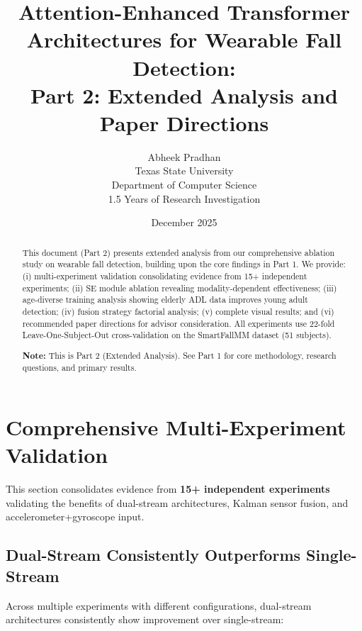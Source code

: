 \documentclass{article}
\title{Attention-Enhanced Transformer Architectures for Wearable Fall Detection:\\Part 2: Extended Analysis and Paper Directions}
\author{Abheek Pradhan\\Texas State University\\Department of Computer Science\\1.5 Years of Research Investigation}
\date{December 2025}
\begin{document}
\maketitle

\begin{abstract}
This document (Part 2) presents extended analysis from our comprehensive ablation study on wearable fall detection, building upon the core findings in Part 1. We provide: (i) multi-experiment validation consolidating evidence from 15+ independent experiments; (ii) SE module ablation revealing modality-dependent effectiveness; (iii) age-diverse training analysis showing elderly ADL data improves young adult detection; (iv) fusion strategy factorial analysis; (v) complete visual results; and (vi) recommended paper directions for advisor consideration. All experiments use 22-fold Leave-One-Subject-Out cross-validation on the SmartFallMM dataset (51 subjects).

\textbf{Note:} This is Part 2 (Extended Analysis). See Part 1 for core methodology, research questions, and primary results.
\end{abstract}

\tableofcontents
\newpage

\section{Comprehensive Multi-Experiment Validation}

This section consolidates evidence from \textbf{15+ independent experiments} validating the benefits of dual-stream architectures, Kalman sensor fusion, and accelerometer+gyroscope input.

\subsection{Dual-Stream Consistently Outperforms Single-Stream}

Across multiple experiments with different configurations, dual-stream architectures consistently show improvement over single-stream:
\end{document}
